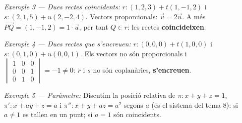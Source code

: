 \emph{Exemple 3 --- Dues rectes coincidents:} $r:(1,2,3)+t(1,-1,2)$ i $s:(2,1,5)+u(2,-2,4)$. Vectors proporcionals: $\vec v=2\vec u$. A més $\overrightarrow{PQ}=(1,-1,2)=1\cdot\vec u$, per tant $Q\in r$: les rectes \textbf{coincideixen}.

\emph{Exemple 4 --- Dues rectes que s'encreuen:} $r:(0,0,0)+t(1,0,0)$ i $s:(0,1,0)+u(0,0,1)$. Els vectors no són proporcionals i $\begin{vmatrix}1&0&0\\0&0&1\\0&1&0\end{vmatrix}=-1\neq0$: $r$ i $s$ no són coplanàries, \textbf{s'encreuen}.

\emph{Exemple 5 --- Paràmetre:} Discutim la posició relativa de $\pi:x+y+z=1$, $\pi':x+ay+z=a$ i $\pi'':x+y+az=a^2$ segons $a$ (és el sistema del tema 8): si $a\neq1$ es tallen en un punt; si $a=1$ són coincidents.
